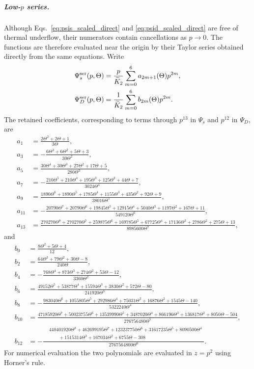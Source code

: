 \documentclass[11pt]{article}
\begin{document}
\subparagraph{Low-$p$ series.}
Although Eqs.~\eqref{eq:psis_scaled_direct} and \eqref{eq:psid_scaled_direct} are free of
thermal underflow, their numerators contain cancellations as $p\rightarrow0$.  The
functions are therefore evaluated near the origin by their Taylor series obtained
directly from the same equations.  Write
\begin{align}
 \Psi_s^{\rm ser}(p,\Theta)
 &=\frac{p}{\widetilde K_2}
   \sum_{m=0}^{6}a_{2m+1}(\Theta)p^{2m},
 \label{eq:psis_lowp_series}\\
 \Psi_D^{\rm ser}(p,\Theta)
 &=\frac{1}{\widetilde K_2}
   \sum_{m=0}^{6}b_{2m}(\Theta)p^{2m}.
 \label{eq:psid_lowp_series}
\end{align}
The retained coefficients, corresponding to terms through $p^{13}$ in $\Psi_s$ and
$p^{12}$ in $\Psi_D$, are
\begin{align}
 a_1&=\frac{2\Theta^2+2\Theta+1}{3\Theta},\\
 a_3&=-\frac{6\Theta^3+6\Theta^2+5\Theta+3}{30\Theta^2},\\
 a_5&=\frac{30\Theta^4+30\Theta^3+27\Theta^2+17\Theta+5}{280\Theta^3},\\
 a_7&=-\frac{210\Theta^5+210\Theta^4+195\Theta^3+125\Theta^2+44\Theta+7}
 {3024\Theta^4},\\
 a_9&=\frac{1890\Theta^6+1890\Theta^5+1785\Theta^4+1155\Theta^3
 +435\Theta^2+92\Theta+9}{38016\Theta^5},\\
 a_{11}&=-\frac{20790\Theta^7+20790\Theta^6+19845\Theta^5+12915\Theta^4
 +5040\Theta^3+1197\Theta^2+167\Theta+11}{549120\Theta^6},\\
 a_{13}&=\frac{270270\Theta^8+270270\Theta^7+259875\Theta^6+169785\Theta^5
 +67725\Theta^4+17136\Theta^3+2786\Theta^2+275\Theta+13}
 {8985600\Theta^7},
 \label{eq:psis_lowp_coeffs}
\end{align}
and
\begin{align}
 b_0&=\frac{8\Theta^2+5\Theta+4}{12},\\
 b_2&=\frac{64\Theta^3+79\Theta^2+30\Theta-8}{240\Theta},\\
 b_4&=-\frac{768\Theta^4+873\Theta^3+274\Theta^2+53\Theta-12}
 {3360\Theta^2},\\
 b_6&=\frac{49152\Theta^5+53877\Theta^4+15594\Theta^3+3830\Theta^2
 +572\Theta-80}{241920\Theta^3},\\
 b_8&=-\frac{983040\Theta^6+1055805\Theta^5+292986\Theta^4+75031\Theta^3
 +16876\Theta^2+1545\Theta-140}{5322240\Theta^4},\\
 b_{10}&=\frac{47185920\Theta^7+50023755\Theta^6+13539990\Theta^5
 +3487020\Theta^4+866196\Theta^3+136817\Theta^2+8050\Theta-504}
 {276756480\Theta^5},\\
 b_{12}&=-\frac{
 \begin{aligned}
  &440401920\Theta^8+462699195\Theta^7+123237750\Theta^6
   +31617235\Theta^5+8090500\Theta^4\\
  &\qquad{}+1515314\Theta^3+167034\Theta^2+6755\Theta-308
 \end{aligned}
 }{2767564800\Theta^6}.
 \label{eq:psid_lowp_coeffs}
\end{align}
For numerical evaluation the two polynomials are evaluated in $z=p^2$ using Horner's
rule.
\end{document}
